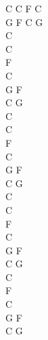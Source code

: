 \documentclass[a5paper, 10pt]{book}
\begin{document}
\begin{minipage}[t]{0.2\textwidth}
C C F C\\
G F C G\\

C\\
C\\
F\\
C\\
G F\\
C G\\

C\\
C\\
F\\
C\\
G F\\
C G\\

C\\
C\\
F\\
C\\
G F\\
C G\\

C\\
F\\
C\\
G F\\
C G\\
\end{minipage}

\newpage
\end{document}
